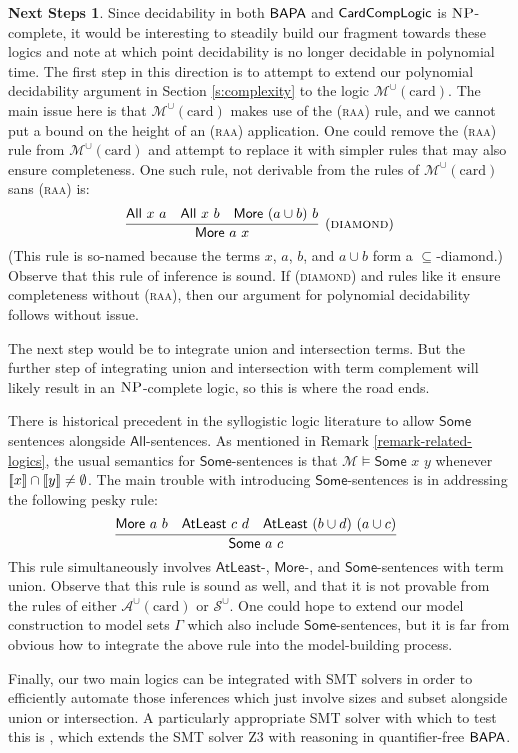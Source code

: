 \documentclass[letterpaper]{article} %
\theoremstyle{definition}
\newtheorem*{nextsteps*}{Next Steps}
\newcommand{\semantics}[1]{[\![\mbox{\em $ #1 $\/}]\!]}
\newcommand{\Model}{\mathcal{M}}
\newcommand{\Aunion}{\mathscr{A}^{\cup}}
\newcommand{\Munion}{\mathscr{M}^{\cup}}
\newcommand{\Sunion}{\mathscr{S}^{\cup}}
\newcommand{\BAPA}{\sf{BAPA}}
\newcommand{\CardCompLogic}{\sf{CardCompLogic}}
\newcommand{\proverule}{\textsc}
\newcommand{\raa}{\proverule{raa}}
\newcommand{\NP}{\textsc{NP}}
\newcommand{\All}[2]{\mathsf{All}\,\,#1\,\,#2}
\newcommand{\Some}[2]{\mathsf{Some}\,\,#1\,\,#2}
\newcommand{\Atleast}[2]{\mathsf{AtLeast}\,\,#1\,\,#2}
\newcommand{\More}[2]{\mathsf{More}\,\,#1\,\,#2}
\newcommand{\AllNoArgs}{\mathsf{All}}
\newcommand{\SomeNoArgs}{\mathsf{Some}}
\newcommand{\AtleastNoArgs}{\mathsf{AtLeast}}
\newcommand{\MoreNoArgs}{\mathsf{More}}
\newcommand{\card}{\mathrm{card}}
\begin{document}
\begin{nextsteps*}
Since decidability in both $\BAPA$ and $\CardCompLogic$ is $\NP$-complete, it would be interesting to steadily build our fragment towards these logics and note at which point decidability is no longer decidable in polynomial time.  The first step in this direction is to attempt to extend our polynomial decidability argument in Section \ref{s:complexity} to the logic $\Munion(\card)$.  The main issue here is that $\Munion(\card)$ makes use of the (\raa) rule, and we cannot put a bound on the height of an (\raa) application.  One could remove the (\raa) rule from $\Munion(\card)$ and attempt to replace it with simpler rules that may also ensure completeness.  One such rule, not derivable from the rules of $\Munion(\card)$ sans (\raa) is:
\[
\infer[(\proverule{diamond})]
    {\More{a}{x}}
    {\All{x}{a} & \All{x}{b} & \More{(a \cup b)}{b}}
\]
(This rule is so-named because the terms $x$, $a$, $b$, and $a \cup b$ form a $\subseteq$-diamond.)
Observe that this rule of inference is sound.  If (\proverule{diamond}) and rules like it ensure completeness without (\raa), then our argument for polynomial decidability follows without issue.

The next step would be to integrate union and intersection terms.
But the further step of integrating union and intersection with term complement will likely result in an $\NP$-complete logic, so this is where the road ends.

There is historical precedent in the syllogistic logic
literature to allow $\SomeNoArgs$ sentences alongside
$\AllNoArgs$-sentences.   As mentioned in Remark \ref{remark-related-logics}, the usual semantics for $\SomeNoArgs$-sentences is that $\Model \models \Some{x}{y}$ whenever $\semantics{x} \cap \semantics{y} \ne \emptyset$.
The main trouble with introducing $\SomeNoArgs$-sentences is in addressing the following pesky rule:
\[
\infer[]
    {\Some{a}{c}}
    {\More{a}{b} & \Atleast{c}{d} & \Atleast{(b \cup d)}{(a \cup c)}}
\]
This rule simultaneously involves $\AtleastNoArgs$-, $\MoreNoArgs$-, and $\SomeNoArgs$-sentences with term union.
Observe that this rule is sound as well, and that it is not provable from the rules of either $\Aunion(\card)$ or $\Sunion$.
One could hope to extend our model construction to model sets $\Gamma$ which also include $\SomeNoArgs$-sentences, but it is far from obvious how to integrate the above rule into the model-building process.

Finally, our two main logics can be integrated with SMT solvers in order to efficiently automate those inferences which just involve sizes and subset alongside union or intersection.  A particularly appropriate SMT solver with which to test this is \cite{cardinality_constraints_smt}, which extends the SMT solver Z$3$ with reasoning in quantifier-free $\BAPA$.


\end{nextsteps*}
\end{document}
